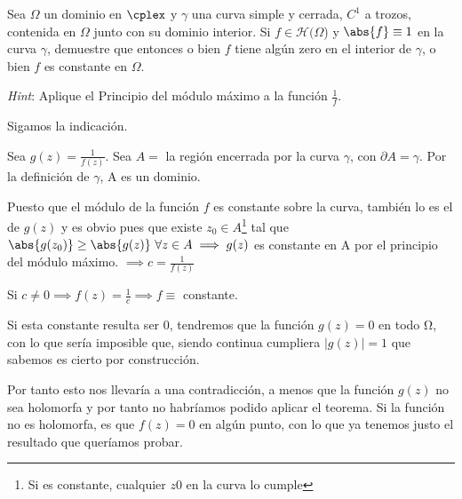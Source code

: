 \begin{problem}[3]
Sea $\Omega$ un dominio en $\cplex$ y $\gamma$ una curva simple y cerrada, $C^1$ a trozos, contenida en $\Omega$ junto con su dominio interior. Si $f \in \mathcal{H}(\Omega$) y $\abs{f} \equiv 1$ en la curva $\gamma$, demuestre que entonces o bien $f$ tiene algún zero en el interior de $\gamma$, o bien $f$ es constante en $\Omega$.

{\it Hint}: Aplique el Principio del módulo máximo a la función $\frac{1}{f}$.

\solution
{}

Sigamos la indicación.

Sea $g(z) = \frac{1}{f(z)}$. Sea $A =$ la región encerrada por la curva $\gamma$, con $\partial A = \gamma$. Por la definición de $\gamma$, A es un dominio.

Puesto que el módulo de la función $f$ es constante sobre la curva, también lo es el de $g(z)$ y es obvio pues que existe $z_0 \in A$\footnote{Si es constante, cualquier $z0$ en la curva lo cumple} tal que $\abs{g(z_0)} \geq \abs{g(z)} \ \forall z \in A \implies g(z)$ es constante en A por el principio del módulo máximo. $\implies c = \frac{1}{f(z)}$

Si $c \neq 0 \implies f(z) = \frac{1}{c} \implies f \equiv $ constante.


Si esta constante resulta ser $0$, tendremos que la función $g(z)=0$ en todo Ω, con lo que sería imposible que, siendo continua cumpliera $|g(z)|=1$ que sabemos es cierto por construcción.

Por tanto esto nos llevaría a una contradicción, a menos que la función $g(z)$ no sea holomorfa y por tanto no habríamos podido aplicar el teorema. Si la función no es holomorfa, es que $f(z)=0$ en algún punto, con lo que ya tenemos justo el resultado que queríamos probar.



\end{problem}

